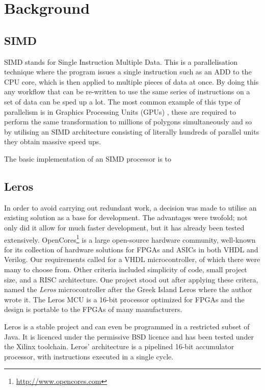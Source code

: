 \section{Background}
\subsection{SIMD}

SIMD stands for Single Instruction Multiple Data.  This is a parallelisation
technique where the program issues a single instruction such as an ADD to the
CPU core, which is then applied to multiple pieces of data at once.  By doing
this any workflow that can be re-written to use the same series of instructions
on a set of data can be sped up a lot.  The most common example of this type of
parallelism is in Graphics Processing Units (GPUs)
\cite{Fatahalian:2008:CLG:1400181.1400197}, these are required to perform the
same transformation to millions of polygons simultaneously and so by utilising
an SIMD architecture consisting of literally hundreds of parallel units they
obtain massive speed ups.

The basic implementation of an SIMD processor is to 

\subsection{Leros}
In order to avoid carrying out redundant work, a decision was made to utilise an
existing solution as a base for development. The advantages were twofold; not only
did it allow for much faster development, but it has already been tested extensively.
 OpenCores\footnote{\url{http://www.opencores.com}}
is a large open-source hardware community, well-known for its collection of hardware solutions for
FPGAs and ASICs in both VHDL and Verilog. Our requirements called for a VHDL
microcontroller, of which there were many to choose from. Other criteria included
simplicity of code, small project size, and a RISC architecture. One project stood out
after applying these critera, named the \emph{Leros} microcontroller after the
Greek Island Leros \cite{schoeberlleros} where the author wrote it.  The Leros MCU is a 16-bit
processor optimized for FPGAs \cite{schoeberlleros} and the design is portable
to the FPGAs of many manufacturers.

Leros is a stable
project and can even be programmed in a restricted subset of Java. It is licenced
under the permissive BSD licence and has been tested under the Xilinx toolchain.
Leros' architecture is a pipelined 16-bit accumulator processor\cite{schoeberlleros},
with instructions executed in a single cycle.

